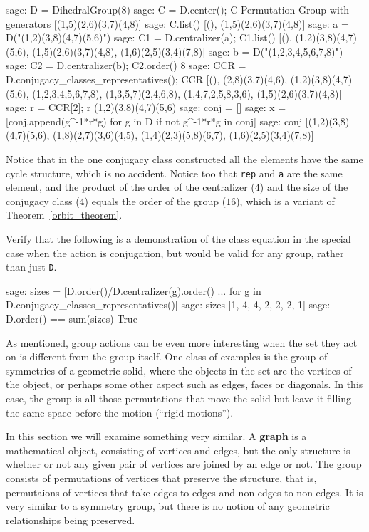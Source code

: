 %
\begin{sageexample}
sage: D = DihedralGroup(8)
sage: C = D.center(); C
Permutation Group with generators [(1,5)(2,6)(3,7)(4,8)]
sage: C.list()
[(), (1,5)(2,6)(3,7)(4,8)]
sage: a = D("(1,2)(3,8)(4,7)(5,6)")
sage: C1 = D.centralizer(a); C1.list()
[(), (1,2)(3,8)(4,7)(5,6), (1,5)(2,6)(3,7)(4,8), (1,6)(2,5)(3,4)(7,8)]
sage: b = D("(1,2,3,4,5,6,7,8)")
sage: C2 = D.centralizer(b); C2.order()
8
sage: CCR = D.conjugacy_classes_representatives(); CCR
[(), (2,8)(3,7)(4,6), (1,2)(3,8)(4,7)(5,6), (1,2,3,4,5,6,7,8),
 (1,3,5,7)(2,4,6,8), (1,4,7,2,5,8,3,6), (1,5)(2,6)(3,7)(4,8)]
sage: r = CCR[2]; r
(1,2)(3,8)(4,7)(5,6)
sage: conj = []
sage: x = [conj.append(g^-1*r*g) for g in D if not g^-1*r*g in conj]
sage: conj
[(1,2)(3,8)(4,7)(5,6), (1,8)(2,7)(3,6)(4,5), (1,4)(2,3)(5,8)(6,7),
 (1,6)(2,5)(3,4)(7,8)]
\end{sageexample}
%
Notice that in the one conjugacy class constructed all the elements have the same cycle structure, which is no accident.  Notice too that \verb?rep? and \verb?a? are the same element, and the product of the order of the centralizer ($4$) and the size of the conjugacy class ($4$) equals the order of the group ($16$), which is a variant of Theorem~\ref{orbit_theorem}.\par
%
Verify that the following is a demonstration of the class equation in the special case when the action is conjugation, but would be valid for any group, rather than just \verb?D?.
%
\begin{sageexample}
sage: sizes = [D.order()/D.centralizer(g).order()
...                for g in D.conjugacy_classes_representatives()]
sage: sizes
[1, 4, 4, 2, 2, 2, 1]
sage: D.order() == sum(sizes)
True
\end{sageexample}
%
%
As mentioned, group actions can be even more interesting when the set they act on is different from the group itself.  One class of examples is the group of symmetries of a geometric solid, where the objects in the set are the vertices of the object, or perhaps some other aspect such as edges, faces or diagonals.  In this case, the group is all those permutations that move the solid but leave it filling the same space before the motion (``rigid motions'').\par
%
In this section we will examine something very similar.  A {\bf graph} is a mathematical object, consisting of vertices and edges, but the only structure is whether or not any given pair of vertices are joined by an edge or not.  The group consists of permutations of vertices that preserve the structure, that is, permutaions of vertices that take edges to edges and non-edges to non-edges.  It is very similar to a symmetry group, but there is no notion of any geometric relationships being preserved.\par
